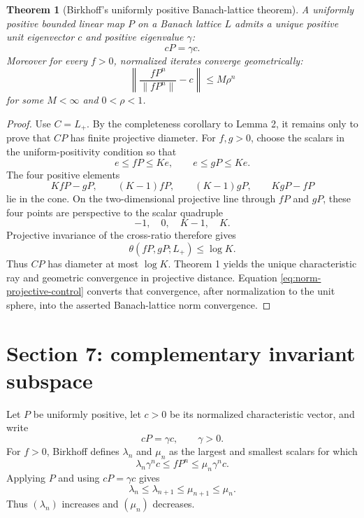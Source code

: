 \documentclass[11pt]{article}
\newtheorem{theorem}{Theorem}
\begin{document}
\begin{theorem}[Birkhoff's uniformly positive Banach-lattice theorem]
A uniformly positive bounded linear map \(P\) on a Banach lattice \(L\) admits a unique positive unit eigenvector \(c\) and positive eigenvalue \(\gamma\):
\[
  cP=\gamma c.
\]
Moreover for every \(f>0\), normalized iterates converge geometrically:
\[
  \left\|\frac{fP^n}{\|fP^n\|}-c\right\| \le M\rho^n
\]
for some \(M<\infty\) and \(0<\rho<1\).
\end{theorem}

\begin{proof}
Use $C=L_+$.  By the completeness corollary to Lemma 2, it remains only to prove that $CP$ has
finite projective diameter.  For $f,g>0$, choose the scalars in the uniform-positivity condition so
that
\[
 e\le fP\le Ke,
 \qquad
 e\le gP\le Ke.
\]
The four positive elements
\[
 KfP-gP,\qquad (K-1)fP,\qquad (K-1)gP,\qquad KgP-fP
\]
lie in the cone.  On the two-dimensional projective line through $fP$ and $gP$, these four points
are perspective to the scalar quadruple
\[
 -1,\quad 0,\quad K-1,\quad K.
\]
Projective invariance of the cross-ratio therefore gives
\[
 \theta(fP,gP;L_+)\le\log K.
\]
Thus $CP$ has diameter at most $\log K$.  Theorem 1 yields the unique characteristic ray and
geometric convergence in projective distance.  Equation \eqref{eq:norm-projective-control} converts
that convergence, after normalization to the unit sphere, into the asserted Banach-lattice norm
convergence.
\end{proof}

\section{Section 7: complementary invariant subspace}
Let $P$ be uniformly positive, let $c>0$ be its normalized characteristic vector, and write
\[
 cP=\gamma c,
 \qquad \gamma>0.
\]
For $f>0$, Birkhoff defines $\lambda_n$ and $\mu_n$ as the largest and smallest scalars for which
\begin{equation}
 \lambda_n\gamma^n c\le fP^n\le\mu_n\gamma^n c.
 \tag{16a}
\end{equation}
Applying $P$ and using $cP=\gamma c$ gives
\begin{equation}
 \lambda_n\le\lambda_{n+1}\le\mu_{n+1}\le\mu_n.
 \tag{16b}
\end{equation}
Thus $(\lambda_n)$ increases and $(\mu_n)$ decreases.
\end{document}

